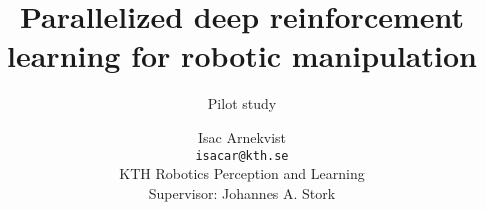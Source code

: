 \documentclass[12pt,a4paper]{scrartcl}
\title{Parallelized deep reinforcement learning for robotic manipulation}
\subtitle{Pilot study}
\author{Isac Arnekvist \\ \texttt{isacar@kth.se} \\ KTH Robotics Perception and Learning \\ Supervisor: Johannes A. Stork}
\begin{document}
\maketitle
\tableofcontents




{}

\end{document}
